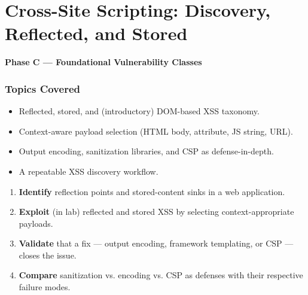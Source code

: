 \documentclass[11pt,letterpaper,oneside]{report}
\begin{document}
\chapter{Cross-Site Scripting: Discovery, Reflected, and Stored}
\textbf{Phase C --- Foundational Vulnerability Classes}

\subsection*{Topics Covered}
\begin{itemize}
  \item Reflected, stored, and (introductory) DOM-based XSS taxonomy.
  \item Context-aware payload selection (HTML body, attribute, JS string, URL).
  \item Output encoding, sanitization libraries, and CSP as defense-in-depth.
  \item A repeatable XSS discovery workflow.
\end{itemize}

\begin{outcomes}
\begin{enumerate}
  \item \textbf{Identify} reflection points and stored-content sinks in a web application.
  \item \textbf{Exploit} (in lab) reflected and stored XSS by selecting context-appropriate payloads.
  \item \textbf{Validate} that a fix --- output encoding, framework templating, or CSP --- closes the issue.
  \item \textbf{Compare} sanitization vs. encoding vs. CSP as defenses with their respective failure modes.
\end{enumerate}
\end{outcomes}
\end{document}
